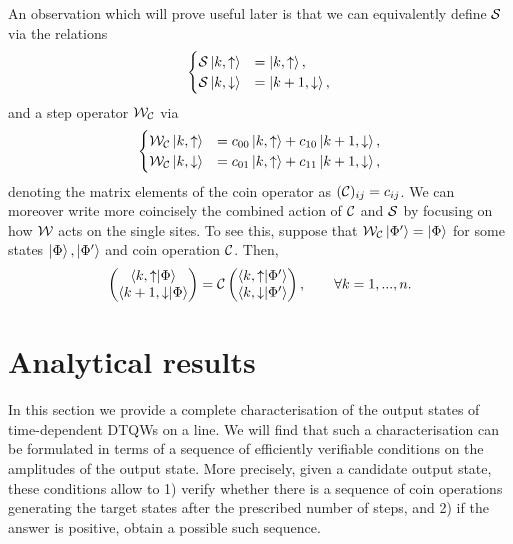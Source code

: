 An observation which will prove useful later  is that we can equivalently define ${\mathcal{S}}$ via the relations
\begin{equation}
\begin{cases}
    {\mathcal{S}}\ket{k,\uparrow} &= \ket{k,\uparrow}, \\
    {\mathcal{S}}\ket{k,\downarrow} &= \ket{k+1, \downarrow},
\end{cases}
\end{equation}
and a step operator ${\mathcal{W}}_{{\mathcal{C}}}$ via
\begin{equation}
\begin{cases}
    {\mathcal{W}}_{\mathcal{C}}\ket{k,\uparrow} &= c_{00} \ket{k,\uparrow} + c_{10} \ket{k+ 1,\downarrow}, \\
    {\mathcal{W}}_{\mathcal{C}}\ket{k,\downarrow} &= c_{01}\ket{k, \uparrow} + c_{11} \ket{k+1, \downarrow},
\end{cases}
\end{equation}
denoting the matrix elements of the coin operator as $({\mathcal{C}})_{ij}=c_{ij}$.
We can moreover write more coincisely the combined action of ${\mathcal{C}}$ and ${\mathcal{S}}$ by focusing on how ${\mathcal{W}}$ acts on the single sites.
To see this, suppose that ${\mathcal{W}}_{\mathcal{C}}\ket{\Phi'}=\ket{\Phi}$ for some states $\ket{\Phi},\ket{\Phi'}$ and coin operation ${\mathcal{C}}$.
Then,
\begin{equation}
    \begin{pmatrix}
        \braket{k,\uparrow}{\Phi} \\
        \braket{k + 1, \downarrow}{\Phi}
    \end{pmatrix} =
    {\mathcal{C}} \begin{pmatrix}
        \braket{k,\uparrow}{\Phi'} \\
        \braket{k,\downarrow}{\Phi'}
    \end{pmatrix},
    \qquad \forall k=1,...,n.
    \label{eq:qw_dynamics_on_single_positions}
\end{equation}

\section{Analytical results}
\label{sec:reachability_conditions}

In this section we provide a complete characterisation of the output states of time-dependent \acp{DTQW} on a line.
We will find that such a characterisation can be formulated in terms of a sequence of efficiently verifiable conditions on the amplitudes of the output state.
More precisely, given a candidate output state, these conditions allow to 1) verify whether there is a sequence of coin operations generating the target states after the prescribed number of steps, and 2) if the answer is positive, obtain a possible such sequence.

